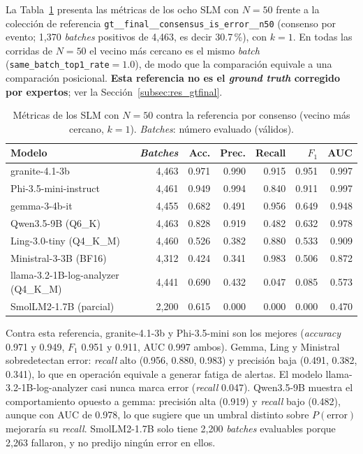 La Tabla~\ref{tab:res_n50} presenta las métricas de los ocho SLM con $N=50$ frente a la colección de referencia \texttt{gt\_\_final\_\_consensus\_is\_error\_\_n50} (consenso por evento; 1{,}370 \textit{batches} positivos de 4{,}463, es decir 30.7\,\%), con $k=1$. En todas las corridas de $N=50$ el vecino más cercano es el mismo \textit{batch} (\texttt{same\_batch\_top1\_rate}$=1.0$), de modo que la comparación equivale a una comparación posicional. \textbf{Esta referencia no es el \textit{ground truth} corregido por expertos}; ver la Sección~\ref{subsec:res_gtfinal}.

\begin{table}[H]
\centering
\caption{Métricas de los SLM con $N=50$ contra la referencia por consenso (vecino más cercano, $k=1$). \textit{Batches}: número evaluado (válidos).}
\label{tab:res_n50}
\small
\begin{tabular}{@{}lrrrrrr@{}}
\toprule
\textbf{Modelo} & \textbf{\textit{Batches}} & \textbf{Acc.} & \textbf{Prec.} & \textbf{Recall} & \textbf{$F_1$} & \textbf{AUC} \\
\midrule
granite-4.1-3b & 4{,}463 & 0.971 & 0.990 & 0.915 & 0.951 & 0.997 \\
Phi-3.5-mini-instruct & 4{,}461 & 0.949 & 0.994 & 0.840 & 0.911 & 0.997 \\
gemma-3-4b-it & 4{,}455 & 0.682 & 0.491 & 0.956 & 0.649 & 0.948 \\
Qwen3.5-9B (Q6\_K) & 4{,}463 & 0.828 & 0.919 & 0.482 & 0.632 & 0.978 \\
Ling-3.0-tiny (Q4\_K\_M) & 4{,}460 & 0.526 & 0.382 & 0.880 & 0.533 & 0.909 \\
Ministral-3-3B (BF16) & 4{,}312 & 0.424 & 0.341 & 0.983 & 0.506 & 0.872 \\
llama-3.2-1B-log-analyzer (Q4\_K\_M) & 4{,}441 & 0.690 & 0.432 & 0.047 & 0.085 & 0.573 \\
SmolLM2-1.7B (parcial) & 2{,}200 & 0.615 & 0.000 & 0.000 & 0.000 & 0.470 \\
\bottomrule
\end{tabular}
\normalsize
\end{table}


Contra esta referencia, granite-4.1-3b y Phi-3.5-mini son los mejores (\textit{accuracy} 0.971 y 0.949, $F_1$ 0.951 y 0.911, AUC 0.997 ambos). Gemma, Ling y Ministral sobredetectan error: \textit{recall} alto (0.956, 0.880, 0.983) y precisión baja (0.491, 0.382, 0.341), lo que en operación equivale a generar fatiga de alertas. El modelo llama-3.2-1B-log-analyzer casi nunca marca error (\textit{recall} 0.047). Qwen3.5-9B muestra el comportamiento opuesto a gemma: precisión alta (0.919) y \textit{recall} bajo (0.482), aunque con AUC de 0.978, lo que sugiere que un umbral distinto sobre $P(\text{error})$ mejoraría su \textit{recall}. SmolLM2-1.7B solo tiene 2{,}200 \textit{batches} evaluables porque 2{,}263 fallaron, y no predijo ningún error en ellos.

